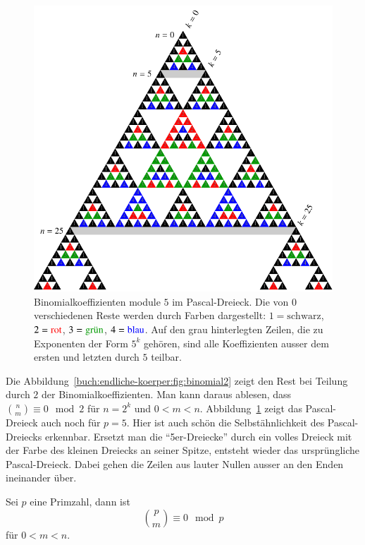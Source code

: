\begin{figure}
\centering
\includegraphics{chapters/30-endlichekoerper/images/binomial5.pdf}
\caption{Binomialkoeffizienten module $5$ im Pascal-Dreieck.
Die von $0$ verschiedenen Reste werden durch Farben dargestellt:
$1=\text{schwarz}$,
$2=\text{\color{farbe2}rot}$,
$3=\text{\color{farbe3}grün}$,
$4=\text{\color{farbe4}blau}$.
Auf den grau hinterlegten Zeilen, die zu Exponenten der Form $5^k$ gehören,
sind alle Koeffizienten ausser dem ersten und letzten durch $5$ teilbar.
\label{buch:endliche-koerper:fig:binomial5}}
\end{figure}
\egroup
Die Abbildung~\ref{buch:endliche-koerper:fig:binomial2} zeigt den
Rest bei Teilung durch $2$ der Binomialkoeffizienten.
Man kann daraus ablesen, dass $\binom{n}{m}\equiv 0\mod 2$ für $n=2^k$ 
und $0<m<n$.
Abbildung~\ref{buch:endliche-koerper:fig:binomial5} zeigt das Pascal-Dreieck
auch noch für $p=5$.
Hier ist auch schön die Selbstähnlichkeit des Pascal-Dreiecks erkennbar.
Ersetzt man die ``5er-Dreiecke'' durch ein volles Dreieck mit der Farbe
des kleinen Dreiecks an seiner Spitze, entsteht wieder das ursprüngliche
Pascal-Dreieck.
Dabei gehen die Zeilen aus lauter Nullen ausser an den Enden ineinander über.

\begin{satz}
\label{buch:endliche-koerper:satz:binom}
Sei $p$ eine Primzahl, dann ist
\[
\binom{p}{m} \equiv 0\mod p
\]
für $0<m<n$.
\end{satz}

